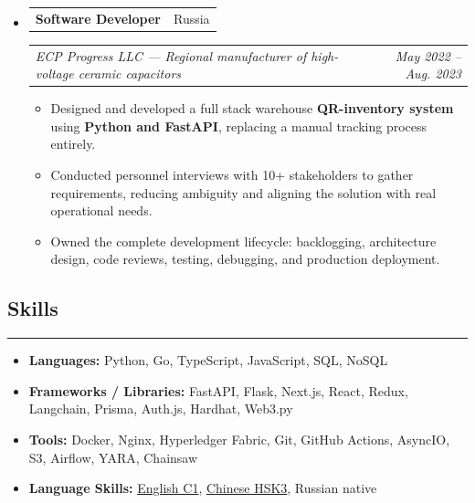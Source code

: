 \documentclass[11pt,letterpaper]{article}
\makeatletter
\newcommand{\headerrow}[2]
{\begin{tabular*}{\linewidth}{l@{\extracolsep{\fill}}r}
#1 & #2 \\
\end{tabular*}}
\makeatother
\begin{document}
\begin{itemize}[leftmargin=0em, itemsep=0.6em]
    \item
    \headerrow
        {\textbf{Software Developer}}
        {Russia}
    \headerrow
        {\emph{ECP Progress LLC --- Regional manufacturer of high-voltage ceramic capacitors}}
        {\emph{May 2022 -- Aug. 2023}}
    \begin{itemize}[leftmargin=1.2em, itemsep=0.1em]
        \renewcommand\labelitemi{$\bullet$}
        \item Designed and developed a full stack warehouse \textbf{QR-inventory system} using
              \textbf{Python and FastAPI}, replacing a manual tracking process entirely.
        \item Conducted personnel interviews with 10+ stakeholders to gather requirements,
              reducing ambiguity and aligning the solution with real operational needs.
        \item Owned the complete development lifecycle: backlogging, architecture design,
              code reviews, testing, debugging, and production deployment.
    \end{itemize}

\end{itemize}

\vspace{0.2cm}

\subsection*{\Large Skills}
\vspace{-0.5em}
\hrule
\vspace{0.3em}

\begin{itemize}[leftmargin=0em, noitemsep]
    \renewcommand\labelitemi{}
    \item \textbf{Languages:} Python, Go, TypeScript, JavaScript, SQL, NoSQL
    \item \textbf{Frameworks / Libraries:} FastAPI, Flask, Next.js, React, Redux, Langchain, Prisma, Auth.js, Hardhat, Web3.py
    \item \textbf{Tools:} Docker, Nginx, Hyperledger Fabric, Git, GitHub Actions, AsyncIO, S3, Airflow, YARA, Chainsaw
    \item \textbf{Language Skills:}
    \href{https://certs.duolingo.com/751e0ef152565727b6d5fd909699ceaa}{English C1},
    \href{https://admin.chinesetest.cn/queryScore.do?sid=c2tActR9Wb%2704b861aefbdc5e9fd0b44afa717d08cbceb0720e582ce25f%2724d7sWsQ5nVUQSwD}{Chinese HSK3},
    Russian native
\end{itemize}
\end{document}
